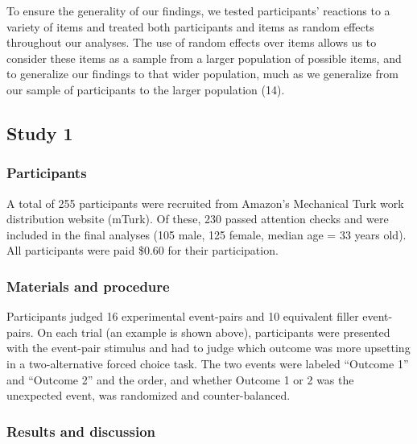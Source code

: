 \documentclass[9pt,twocolumn,twoside,lineno]{pnas-new}
\begin{document}
To ensure the generality of our findings, we tested participants'
reactions to a variety of items and treated both participants and items
as random effects throughout our analyses. The use of random effects
over items allows us to consider these items as a sample from a larger
population of possible items, and to generalize our findings to that
wider population, much as we generalize from our sample of participants
to the larger population (14).

\subsection*{Study 1}\label{study1}

\subsubsection*{Participants}\label{s1-participants}

A total of 255 participants were recruited from Amazon's Mechanical Turk
work distribution website (mTurk). Of these, 230 passed attention checks
and were included in the final analyses (105 male, 125 female, median
age = 33 years old). All participants were paid \$0.60 for their
participation.

\subsubsection*{Materials and procedure}\label{s1-materials-procedure}

Participants judged 16 experimental event-pairs and 10 equivalent filler
event-pairs. On each trial (an example is shown above), participants
were presented with the event-pair stimulus and had to judge which
outcome was more upsetting in a two-alternative forced choice task. The
two events were labeled ``Outcome 1'' and ``Outcome 2'' and the order,
and whether Outcome 1 or 2 was the unexpected event, was randomized and
counter-balanced.

\subsubsection*{Results and discussion}\label{s1-results}
\end{document}
